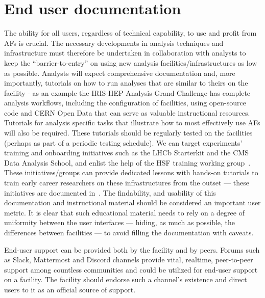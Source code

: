 \section{End user documentation}
\label{documentation}

The ability for all users, regardless of technical capability, to use and profit from AFs is crucial. The necessary developments in analysis techniques and infrastructure must therefore be undertaken in collaboration with analysts to keep the “barrier-to-entry” on using new analysis facilities/infrastructures as low as possible. Analysts will expect comprehensive documentation and, more importantly, tutorials on how to run analyses that are similar to theirs on the facility - as an example the IRIS-HEP Analysis Grand Challenge has complete analysis workflows, including the configuration of facilities, using open-source code and CERN Open Data that can serve as valuable instructional resources. Tutorials for analysis specific tasks that illustrate how to most effectively use AFs will also be required. These tutorials should be regularly tested on the facilities (perhaps as part of a periodic testing schedule). We can target experiments’ training and onboarding initiatives such as the LHCb Starterkit and the CMS Data Analysis School, and enlist the help of the HSF training working group~\cite{hsftraining}. These initiatives/groups can provide dedicated lessons with hands-on tutorials to train early career researchers on these infrastructures from the outset --- these initiatives are documented in~\cite{Hageboeck:2023kcb}. The findability, and usability of this documentation and instructional material should be considered an important user metric. It is clear that such educational material needs to rely on a degree of uniformity between the user interfaces --- hiding, as much as possible, the differences between facilities --- to avoid filling the documentation with caveats.

End-user support can be provided both by the facility and by peers. Forums such as Slack, Mattermost and Discord channels provide vital, realtime, peer-to-peer support among countless communities and could be utilized for end-user support on a facility. The facility should endorse such a channel's existence and direct users to it as an official source of support.
